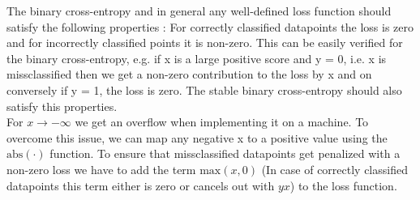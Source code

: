 \documentclass[11pt]{article}
\begin{document}
\noindent The binary cross-entropy and in general any well-defined loss function should satisfy the following properties : For correctly classified datapoints the loss is zero and for incorrectly classified points it is non-zero. This can be easily verified for the binary cross-entropy, e.g. if x is a large positive score and y = 0, i.e. x is missclassified then we get a non-zero contribution to the loss by x and on conversely if y = 1, the loss is zero. The stable binary cross-entropy should also satisfy this properties.
\\
\noindent For $x \rightarrow -\infty$ we get an overflow  when implementing it on a machine. To overcome this issue, we can map any negative x to a positive value using the $\text{abs}(\cdot)$ function. To ensure that missclassified datapoints get penalized with a non-zero loss we have to add the term $\text{max}(x, 0)$ (In case of correctly classified datapoints this term either is zero or cancels out with $yx$) to the loss function.
\end{document}
